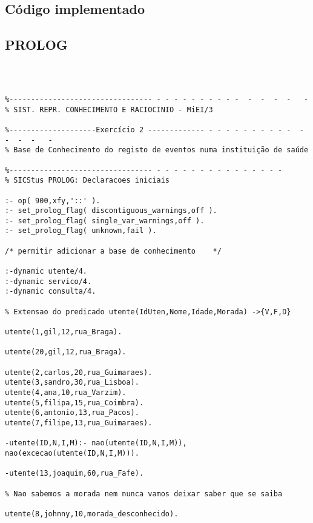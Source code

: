 \documentclass[pdftex,12pt,a4paper]{report}
\begin{document}


\tableofcontents
\listoffigures 





\begin{appendices}
	\chapter{Código implementado}
	\section{PROLOG}
	
\begin{verbatim}



%--------------------------------- - - - - - - - - - -  -  -  -  -   -
% SIST. REPR. CONHECIMENTO E RACIOCINIO - MiEI/3

%--------------------Exercício 2 ------------- - - - - - - - - - -  -  -  -  -   -
% Base de Conhecimento do registo de eventos numa instituição de saúde

%--------------------------------- - - - - - - - - - - - - - - -
% SICStus PROLOG: Declaracoes iniciais

:- op( 900,xfy,'::' ).
:- set_prolog_flag( discontiguous_warnings,off ).
:- set_prolog_flag( single_var_warnings,off ).
:- set_prolog_flag( unknown,fail ).

/* permitir adicionar a base de conhecimento	*/

:-dynamic utente/4.
:-dynamic servico/4.
:-dynamic consulta/4.

% Extensao do predicado utente(IdUten,Nome,Idade,Morada) ->{V,F,D}

utente(1,gil,12,rua_Braga).

utente(20,gil,12,rua_Braga).

utente(2,carlos,20,rua_Guimaraes).
utente(3,sandro,30,rua_Lisboa).
utente(4,ana,10,rua_Varzim).
utente(5,filipa,15,rua_Coimbra).
utente(6,antonio,13,rua_Pacos).
utente(7,filipe,13,rua_Guimaraes).

-utente(ID,N,I,M):- nao(utente(ID,N,I,M)),
nao(excecao(utente(ID,N,I,M))).

-utente(13,joaquim,60,rua_Fafe).

% Nao sabemos a morada nem nunca vamos deixar saber que se saiba

utente(8,johnny,10,morada_desconhecido).


\end{verbatim}
\end{appendices}
\end{document}
